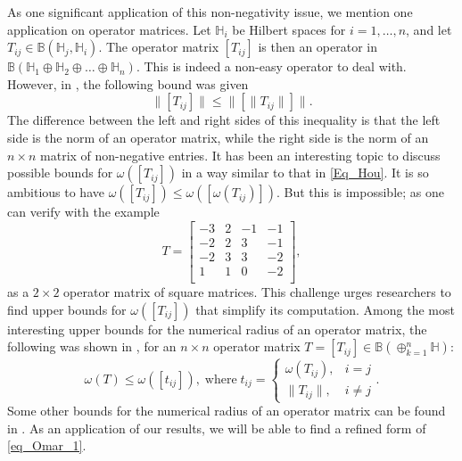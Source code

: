 \documentclass[12pt,twoside,reqno]{amsart}
\numberwithin{equation}{section}
\begin{document}
As one significant application of this non-negativity issue, we mention one application on operator matrices. Let $\mathbb{H}_i$ be Hilbert spaces for $i=1,\ldots,n$, and let $T_{ij}\in\mathbb{B}(\mathbb{H}_j,\mathbb{H}_i)$. The operator matrix $[T_{ij}]$ is then an operator in $\mathbb{B}(\mathbb{H}_1\oplus\mathbb{H}_2\oplus\ldots\oplus\mathbb{H}_n).$ This is indeed a non-easy operator to deal with. However, in \cite{Hou_IEOT_1995}, the following bound was given
\begin{equation}\label{Eq_Hou}
\|[T_{ij}]\|\leq\|[\|T_{ij}\|]\|.
\end{equation}
The difference between the left and right sides of this inequality is that the left side is the norm of an operator matrix, while the right side is the norm of an $n\times n$ matrix of non-negative entries. It has been an interesting topic to discuss possible bounds for $\omega\left([T_{ij}]\right)$ in a way similar to that in \eqref{Eq_Hou}. It is so ambitious to have $\omega\left([T_{ij}]\right)\leq \omega\left([\omega(T_{ij})]\right).$ But this is impossible; as one can verify with the example
\[T=\left[
\begin{array}{cccc}
 -3 & 2 & -1 & -1 \\
 -2 & 2 & 3 & -1 \\
 -2 & 3 & 3 & -2 \\
 1 & 1 & 0 & -2 \\
\end{array}
\right],\]
as a $2\times 2$ operator matrix of square matrices. This challenge urges researchers to find upper bounds for $\omega\left([T_{ij}]\right)$ that simplify its computation. Among the most interesting upper bounds for the numerical radius of an operator matrix, the following was shown in  \cite{Abu-Omar_LAA_2015}, for an $n\times n$ operator matrix $T=[T_{ij}]\in\mathbb{B}(\oplus_{k=1}^{n}\mathbb{H})$:
\begin{equation}  \label{eq_Omar_1}
\omega(T)\leq \omega\left([t_{ij}]\right),\;{\text{where}}\; t_{ij}=\left\{%
\begin{array}{cc}
\omega(T_{ij}), & i=j \\ 
\|T_{ij}\|, & i\not=j%
\end{array}%
\right..
\end{equation}
Some other bounds for the numerical radius of an operator matrix can be found in \cite{Audeh_Filomat_2025, Bhunia_Miskolc_2023, Hajmohamadi_JMI_2018, Hirzallah_IEOT_2011,
Jana_MathSlov_2024, Sababheh_MIA_2024}. As an application of our results, we will be able to find a refined form of \eqref{eq_Omar_1}.
\end{document}
